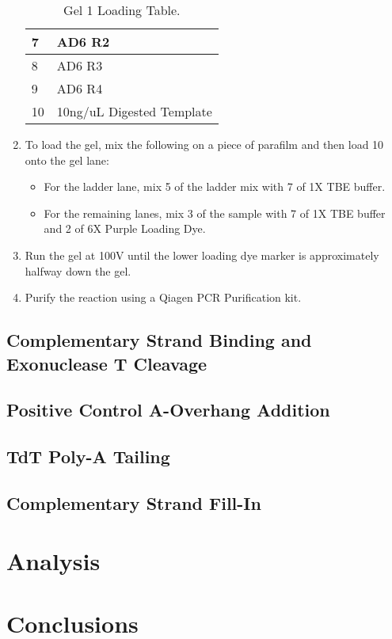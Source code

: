 \documentclass{ssiBio}
\begin{document}
\begin{enumerate}
\begin{table}[ht]
\begin{tabular}{|l|l|}
    7 & AD6 R2 \\ \hline
    8 & AD6 R3 \\ \hline
    9 & AD6 R4 \\ \hline
    10 & 10ng/uL Digested Template \\ \hline
    \end{tabular}
    \caption{\label{tab:gel-1-table}Gel 1 Loading Table.}
    \end{table}
  \item{To load the gel, mix the following on a piece of parafilm and then load 10\uL{} onto the gel lane:}
  \begin{itemize}
    \item{For the ladder lane, mix 5\uL{} of the ladder mix with 7\uL{} of 1X TBE buffer.}
    \item{For the remaining lanes, mix 3\uL{} of the sample with 7\uL{} of 1X TBE buffer and 2\uL{} of 6X Purple Loading Dye.}
  \end{itemize}
  \item{Run the gel at 100V until the lower loading dye marker is approximately halfway down the gel.}
  \item{Purify the reaction using a Qiagen PCR Purification kit.}
  \stopPoint{}
\end{enumerate}

\subsection{Complementary Strand Binding and Exonuclease T Cleavage}

\subsection{Positive Control A-Overhang Addition}

\subsection{TdT Poly-A Tailing}

\subsection{Complementary Strand Fill-In}

\section{Analysis}

\section{Conclusions}



\end{document}
